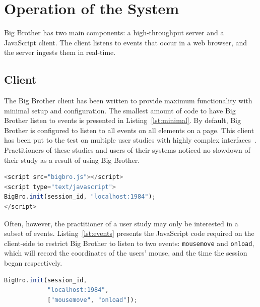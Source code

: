 \section{Operation of the System}


Big Brother has two main components: a high-throughput server and a JavaScript client. The client listens to events that occur in a web browser, and the server ingests them in real-time.
\vspace{-8pt}
\subsection{Client}

The Big Brother client has been written to provide maximum functionality with minimal setup and configuration. The smallest amount of code to have Big Brother listen to events is presented in Listing~\ref{lst:minimal}. By default, Big Brother is configured to listen to all events on all elements on a page. This client has been put to the test on multiple user studies with highly complex interfaces~\cite{cross2021search,jimmy2019health,jimmy2020health}. Practitioners of these studies and users of their systems noticed no slowdown of their study as a result of using Big Brother.

\begin{lstlisting}[language=JavaScript, label=lst:minimal, caption=Minimal example of code required to initialise \bb on the client-side. Note the \texttt{session\_id} which should already be initialised elsewhere.]
<script src="bigbro.js"></script>
<script type="text/javascript">
BigBro.init(session_id, "localhost:1984");
</script>
\end{lstlisting}

\noindent
Often, however, the practitioner of a user study may only be interested in a subset of events. Listing~\ref{lst:events} presents the JavaScript code required on the client-side to restrict Big Brother to listen to two events: \texttt{mousemove} and \texttt{onload}, which will record the coordinates of the users' mouse, and the time the session began respectively.

\begin{lstlisting}[language=JavaScript, label=lst:events, caption=Initialising \bb to listen on only certain global events. HTML code removed for brevity.]
BigBro.init(session_id, 
            "localhost:1984", 
            ["mousemove", "onload"]);
\end{lstlisting}

